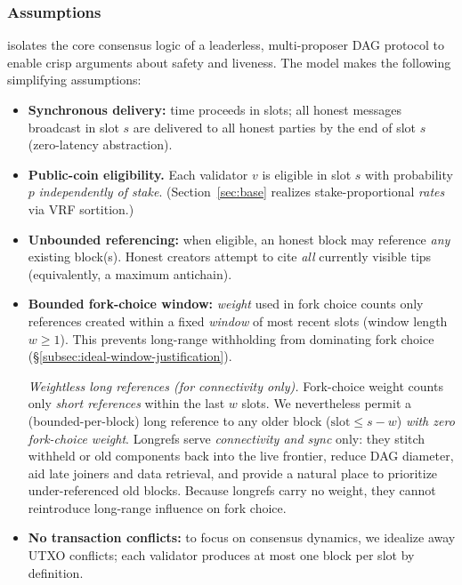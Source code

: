 \subsubsection{Assumptions}
\label{subsec:ideal-overview}
\ProjIdeal isolates the core consensus logic of a leaderless, multi-proposer DAG protocol to enable crisp arguments about safety and liveness. The model makes the following simplifying assumptions:
\begin{itemize}
  \item \textbf{Synchronous delivery:} time proceeds in slots; all honest messages broadcast in slot $s$ are delivered to all honest parties by the end of slot $s$ (zero-latency abstraction).
    \item \textbf{Public-coin eligibility.} 
  Each validator $v$ is eligible in slot $s$ with probability $p$ \emph{independently of stake}. (Section~\ref{sec:base} realizes stake-proportional \emph{rates} via VRF sortition.) 
  
  \item \textbf{Unbounded referencing:} when eligible, an honest block may reference \emph{any} existing block(s). Honest creators attempt to cite \emph{all} currently visible tips (equivalently, a maximum antichain).%
  \item \textbf{Bounded fork-choice window:} \emph{weight} used in fork choice counts only references created within a fixed \emph{window} of most recent slots (window length $w\ge1$). This prevents long-range withholding from dominating fork choice (\S\ref{subsec:ideal-window-justification}).
  
  \noindent\textit{Weightless long references (for connectivity only).}
Fork-choice weight counts only \emph{short references} within the last $w$ slots.
We nevertheless permit a (bounded-per-block) long reference to any older block
(\(\mathrm{slot}\le s-w\)) \emph{with zero fork-choice weight}. Longrefs serve
\emph{connectivity and sync} only: they stitch withheld or old components back
into the live frontier, reduce DAG diameter, aid late joiners and data retrieval,
and provide a natural place to prioritize under-referenced old blocks. Because
longrefs carry no weight, they cannot reintroduce long-range influence on
fork choice.



  \item \textbf{No transaction conflicts:} to focus on consensus dynamics, we idealize away UTXO conflicts; each validator produces at most one block per slot by definition.
\end{itemize}



